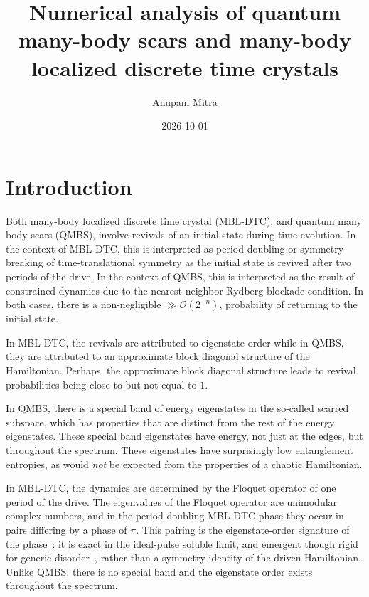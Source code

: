 \documentclass[longbibliography]{revtex4-2}
\begin{document}
\title{Numerical analysis of quantum many-body scars and many-body localized
discrete time crystals}
\author{Anupam Mitra}
\date{2026-10-01}

\maketitle

\section{Introduction}\label{introduction}

Both many-body localized discrete time crystal (MBL-DTC), and quantum
many body scars (QMBS), involve revivals of an initial state during
time evolution. In the context of MBL-DTC, this is interpreted as period
doubling or symmetry breaking of time-translational symmetry as the
initial state is revived after two periods of the drive. In the context
of QMBS, this is interpreted as the result of constrained dynamics due
to the nearest neighbor Rydberg blockade condition. In both cases, there
is a non-negligible \(\gg \mathcal{O}(2^{-n})\), probability of
returning to the initial state.

In MBL-DTC, the revivals are attributed to eigenstate order while in
QMBS, they are attributed to an approximate block diagonal structure of
the Hamiltonian. Perhaps, the approximate block diagonal structure leads
to revival probabilities being close to but not equal to \(1\).

In QMBS, there is a special band of energy eigenstates in the so-called
scarred subspace, which has properties that are distinct from the rest
of the energy eigenstates. These special band eigenstates have energy,
not just at the edges, but throughout the spectrum. These eigenstates
have surprisingly low entanglement entropies, as would \emph{not} be
expected from the properties of a chaotic Hamiltonian.

In MBL-DTC, the dynamics are determined by the Floquet operator of one
period of the drive. The eigenvalues of the Floquet operator are
unimodular complex numbers, and in the period-doubling MBL-DTC phase
they occur in pairs differing by a phase of $\pi$. This pairing is the
eigenstate-order signature of the phase~\cite{khemani2016phase,
else2016floquet}: it is exact in the ideal-pulse soluble limit, and
emergent though rigid for generic
disorder~\cite{yao2017discrete}, rather than a symmetry identity of the
driven Hamiltonian. Unlike QMBS, there is no special band and the
eigenstate order exists throughout the spectrum.
\end{document}
